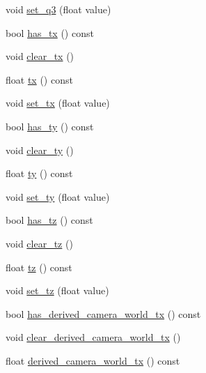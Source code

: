 \begin{DoxyCompactItemize}
void \hyperlink{class_s_s_l___geometry_camera_calibration_ab419a848af1b84cbcb33748194c929c0}{set\-\_\-q3} (float value)
\item 
bool \hyperlink{class_s_s_l___geometry_camera_calibration_a56b198945abe6af44fbc4345dc7e20dd}{has\-\_\-tx} () const 
\item 
void \hyperlink{class_s_s_l___geometry_camera_calibration_a451b9a87b12f2d35478aab8751286794}{clear\-\_\-tx} ()
\item 
float \hyperlink{class_s_s_l___geometry_camera_calibration_a0ac24827d1e598a2d64a48b98846c2b9}{tx} () const 
\item 
void \hyperlink{class_s_s_l___geometry_camera_calibration_aaa6731fd52b84ef849a79847794d0150}{set\-\_\-tx} (float value)
\item 
bool \hyperlink{class_s_s_l___geometry_camera_calibration_ad0ffa28a8b76d93b058d86bf32510c97}{has\-\_\-ty} () const 
\item 
void \hyperlink{class_s_s_l___geometry_camera_calibration_a0a755f17cfc1746b1f1e5218698b1cba}{clear\-\_\-ty} ()
\item 
float \hyperlink{class_s_s_l___geometry_camera_calibration_ab44831e97df279d892da35a27a01d910}{ty} () const 
\item 
void \hyperlink{class_s_s_l___geometry_camera_calibration_a36a642a1e37b7c4e2e4b28e3dc764520}{set\-\_\-ty} (float value)
\item 
bool \hyperlink{class_s_s_l___geometry_camera_calibration_acfd66837d1c82b8c2d6af29b6e032205}{has\-\_\-tz} () const 
\item 
void \hyperlink{class_s_s_l___geometry_camera_calibration_a2bf2ae33774d98a01f2fdeef313d81c7}{clear\-\_\-tz} ()
\item 
float \hyperlink{class_s_s_l___geometry_camera_calibration_afc6cdaae7c4708b0fcb70fb47cbb30b8}{tz} () const 
\item 
void \hyperlink{class_s_s_l___geometry_camera_calibration_a1c9eec7f2c08df7ab5ed50f378508026}{set\-\_\-tz} (float value)
\item 
bool \hyperlink{class_s_s_l___geometry_camera_calibration_a1c1a73e8e1007f75d6b3d70775e4b4f4}{has\-\_\-derived\-\_\-camera\-\_\-world\-\_\-tx} () const 
\item 
void \hyperlink{class_s_s_l___geometry_camera_calibration_a0f6bb3ccaa8b2803b2b08043fd102935}{clear\-\_\-derived\-\_\-camera\-\_\-world\-\_\-tx} ()
\item 
float \hyperlink{class_s_s_l___geometry_camera_calibration_a0f33b317c09e946045659e0b85bdd245}{derived\-\_\-camera\-\_\-world\-\_\-tx} () const 

\end{DoxyCompactItemize}
